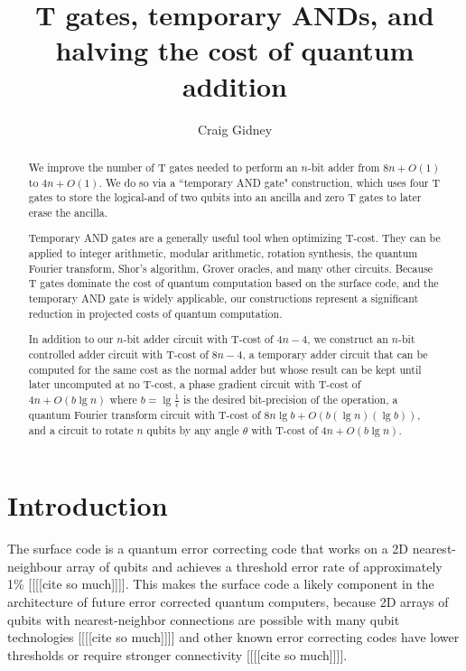 \documentclass[twocolumn,longbibliography]{quantumarticle-customized}
\title{T gates, temporary ANDs, and halving the cost of quantum addition}
\author{Craig Gidney}
\affiliation{Google, Santa Barbara, CA 93117, USA}
\begin{document}
\maketitle

\begin{abstract}
We improve the number of T gates needed to perform an $n$-bit adder from $8n + O(1)$ \cite{Cuccaro2004, Amy2013, AustinDiscussionsAndEmails2017} to $4n + O(1)$.
We do so via a ``temporary AND gate" construction, which uses four T gates to store the logical-and of two qubits into an ancilla and zero T gates to later erase the ancilla.

Temporary AND gates are a generally useful tool when optimizing T-cost.
They can be applied to integer arithmetic, modular arithmetic, rotation synthesis, the quantum Fourier transform, Shor's algorithm, Grover oracles, and many other circuits.
Because T gates dominate the cost of quantum computation based on the surface code, and the temporary AND gate is widely applicable, our constructions represent a significant reduction in projected costs of quantum computation.

In addition to our $n$-bit adder circuit with T-cost of $4n-4$, we construct an $n$-bit controlled adder circuit with T-cost of $8n-4$, a temporary adder circuit that can be computed for the same cost as the normal adder but whose result can be kept until later uncomputed at no T-cost, a phase gradient circuit with T-cost of $4n + O(b \lg n)$ where $b = \lg \frac{1}{\epsilon}$ is the desired bit-precision of the operation, a quantum Fourier transform circuit with T-cost of $8 n \lg b + O(b (\lg n) (\lg b))$, and a circuit to rotate $n$ qubits by any angle $\theta$ with T-cost of $4n + O(b \lg n)$.
\end{abstract}


\section{Introduction}
\label{sec:introduction}

The surface code is a quantum error correcting code that works on a 2D nearest-neighbour array of qubits and achieves a threshold error rate of approximately 1\% [[[[cite so much]]]].
This makes the surface code a likely component in the architecture of future error corrected quantum computers, because 2D arrays of qubits with nearest-neighbor connections are possible with many qubit technologies [[[[cite so much]]]] and other known error correcting codes have lower thresholds or require stronger connectivity [[[[cite so much]]]].
\end{document}
